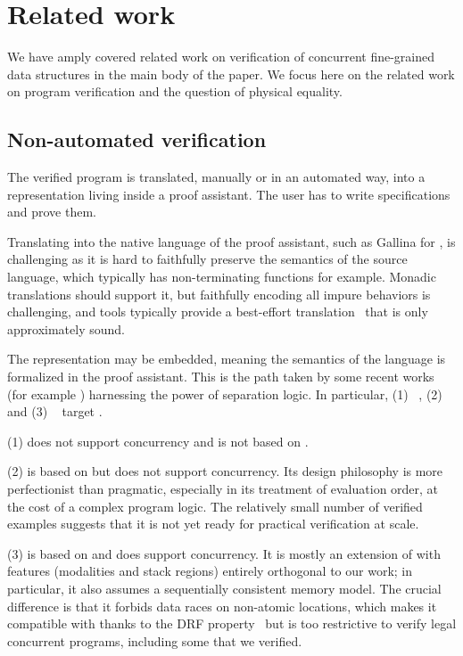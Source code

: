 \section{Related work}
\label{sec:related}

We have amply covered related work on verification of concurrent fine-grained data structures in the main body of the paper. We focus here on the related work on program verification and the question of physical equality.

\subsection{Non-automated verification}

The verified program is translated, manually or in an automated way, into a representation living inside a proof assistant.
The user has to write specifications and prove them.

Translating into the native language of the proof assistant, such as Gallina for \Rocq, is challenging as it is hard to faithfully preserve the semantics of the source language, which typically has non-terminating functions for example. Monadic translations should support it, but faithfully encoding all impure behaviors is challenging, and tools typically provide a best-effort translation~\citep{coq-of-ocaml,DBLP:conf/cpp/Spector-Zabusky18} that is only approximately sound.

The representation may be embedded, meaning the semantics of the language is formalized in the proof assistant.
This is the path taken by some recent works (for example \citet{DBLP:journals/pacmpl/GondelmanHPTB23}) harnessing the power of separation logic.
In particular, (1) \CFML~\citep{DBLP:books/hal/Chargueraud23}, (2) \Osiris~\citep{SeassauYMP25} and (3) \DRFCaml~\citep{DBLP:journals/pacmpl/GeorgesPEWDECPD25} target \OCaml.

(1) \CFML does not support concurrency and is not based on \Iris.

(2) \Osiris is based on \Iris but does not support concurrency.
Its design philosophy is more perfectionist than pragmatic, especially in its treatment of evaluation order, at the cost of a complex program logic.
The relatively small number of verified examples suggests that it is not yet ready for practical verification at scale.

(3) \DRFCaml is based on \Iris and does support concurrency.
It is mostly an extension of \HeapLang with features (modalities and stack regions) entirely orthogonal to our work; in particular, it also assumes a sequentially consistent memory model.
The crucial difference is that it forbids data races on non-atomic locations, which makes it compatible with \OCamlFive thanks to the DRF property~\citep{DBLP:conf/pldi/DolanSM18} but is too restrictive to verify legal concurrent programs, including some that we verified.


